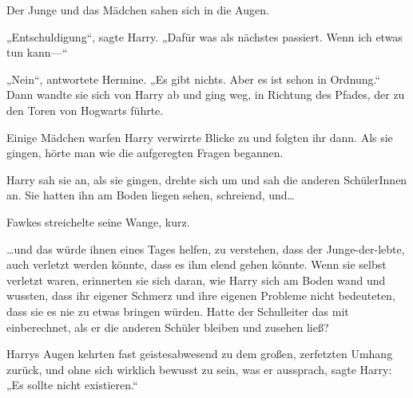 Der Junge und das Mädchen sahen sich in die Augen.

„Entschuldigung“, sagte Harry. „Dafür was als nächstes passiert. Wenn ich etwas tun kann—“

„Nein“, antwortete Hermine. „Es gibt nichts. Aber es ist schon in Ordnung.“ Dann wandte sie sich von Harry ab und ging weg, in Richtung des Pfades, der zu den Toren von Hogwarts führte.

Einige Mädchen warfen Harry verwirrte Blicke zu und folgten ihr dann. Als sie gingen, hörte man wie die aufgeregten Fragen begannen.

Harry sah sie an, als sie gingen, drehte sich um und sah die anderen SchülerInnen an. Sie hatten ihn am Boden liegen sehen, schreiend, und…

Fawkes streichelte seine Wange, kurz.

…und das würde ihnen eines Tages helfen, zu verstehen, dass der Junge-der-lebte, auch verletzt werden könnte, dass es ihm elend gehen könnte. Wenn sie selbst verletzt waren, erinnerten sie sich daran, wie Harry sich am Boden wand und wussten, dass ihr eigener Schmerz und ihre eigenen Probleme nicht bedeuteten, dass sie es nie zu etwas bringen würden. Hatte der Schulleiter das mit einberechnet, als er die anderen Schüler bleiben und zusehen ließ?

Harrys Augen kehrten fast geistesabwesend zu dem großen, zerfetzten Umhang zurück, und ohne sich wirklich bewusst zu sein, was er aussprach, sagte Harry: „Es sollte nicht existieren.“

